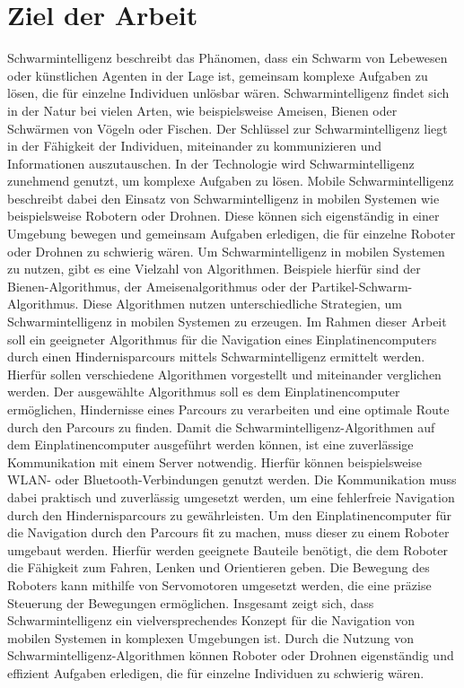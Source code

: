 \section{Ziel der Arbeit}
\label{sec:ziel}
Schwarmintelligenz beschreibt das Phänomen, dass ein Schwarm von Lebewesen oder künstlichen Agenten in der Lage ist, gemeinsam komplexe Aufgaben zu lösen, die für einzelne Individuen unlösbar wären. Schwarmintelligenz findet sich in der Natur bei vielen Arten, wie beispielsweise Ameisen, Bienen oder Schwärmen von Vögeln oder Fischen. Der Schlüssel zur Schwarmintelligenz liegt in der Fähigkeit der Individuen, miteinander zu kommunizieren und Informationen auszutauschen.
In der Technologie wird Schwarmintelligenz zunehmend genutzt, um komplexe Aufgaben zu lösen. Mobile Schwarmintelligenz beschreibt dabei den Einsatz von Schwarmintelligenz in mobilen Systemen wie beispielsweise Robotern oder Drohnen. Diese können sich eigenständig in einer Umgebung bewegen und gemeinsam Aufgaben erledigen, die für einzelne Roboter oder Drohnen zu schwierig wären.
Um Schwarmintelligenz in mobilen Systemen zu nutzen, gibt es eine Vielzahl von Algorithmen. Beispiele hierfür sind der Bienen-Algorithmus, der Ameisenalgorithmus oder der Partikel-Schwarm-Algorithmus. Diese Algorithmen nutzen unterschiedliche Strategien, um Schwarmintelligenz in mobilen Systemen zu erzeugen.
Im Rahmen dieser Arbeit soll ein geeigneter Algorithmus für die Navigation eines Einplatinencomputers durch einen Hindernisparcours mittels Schwarmintelligenz ermittelt werden. Hierfür sollen verschiedene Algorithmen vorgestellt und miteinander verglichen werden. Der ausgewählte Algorithmus soll es dem Einplatinencomputer ermöglichen, Hindernisse eines Parcours zu verarbeiten und eine optimale Route durch den Parcours zu finden.
Damit die Schwarmintelligenz-Algorithmen auf dem Einplatinencomputer ausgeführt werden können, ist eine zuverlässige Kommunikation mit einem Server notwendig. Hierfür können beispielsweise WLAN- oder Bluetooth-Verbindungen genutzt werden. Die Kommunikation muss dabei praktisch und zuverlässig umgesetzt werden, um eine fehlerfreie Navigation durch den Hindernisparcours zu gewährleisten.
Um den Einplatinencomputer für die Navigation durch den Parcours fit zu machen, muss dieser zu einem Roboter umgebaut werden. Hierfür werden geeignete Bauteile benötigt, die dem Roboter die Fähigkeit zum Fahren, Lenken und Orientieren geben. Die Bewegung des Roboters kann mithilfe von Servomotoren umgesetzt werden, die eine präzise Steuerung der Bewegungen ermöglichen.
Insgesamt zeigt sich, dass Schwarmintelligenz ein vielversprechendes Konzept für die Navigation von mobilen Systemen in komplexen Umgebungen ist. Durch die Nutzung von Schwarmintelligenz-Algorithmen können Roboter oder Drohnen eigenständig und effizient Aufgaben erledigen, die für einzelne Individuen zu schwierig wären.

